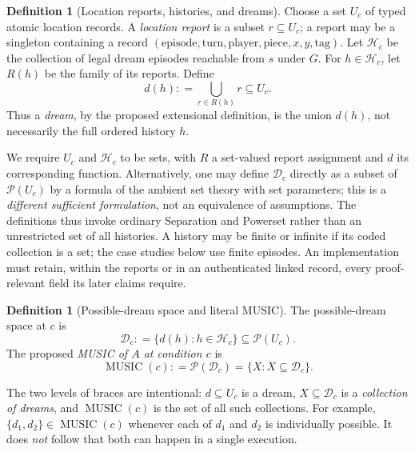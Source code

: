 \documentclass[11pt,letterpaper]{article}
\theoremstyle{definition}
\newtheorem{definition}[theorem]{Definition}
\theoremstyle{remark}
\newcommand{\PSet}{\mathcal{P}}
\newcommand{\Dream}{\mathcal{D}}
\newcommand{\Music}{\operatorname{MUSIC}}
\newcommand{\Def}{\mathrel{\mathop:}=}
\begin{document}
\begin{definition}[Location reports, histories, and dreams]
Choose a set $U_c$ of typed atomic location records. A \emph{location report} is a subset $r\subseteq U_c$; a report may be a singleton containing a record $(\mathrm{episode},\mathrm{turn},\mathrm{player},\mathrm{piece},x,y,\mathrm{tag})$. Let $\mathcal H_c$ be the collection of legal dream episodes reachable from $s$ under $G$. For $h\in\mathcal H_c$, let $R(h)$ be the family of its reports. Define
\begin{equation}\label{eq:dream}
 d(h)\Def \bigcup_{r\in R(h)}r\subseteq U_c.
\end{equation}
Thus a \emph{dream}, by the proposed extensional definition, is the union $d(h)$, not necessarily the full ordered history $h$.
\end{definition}
We require $U_c$ and $\mathcal H_c$ to be sets, with $R$ a set-valued report assignment and $d$ its corresponding function. Alternatively, one may define $\Dream_c$ directly as a subset of $\PSet(U_c)$ by a formula of the ambient set theory with set parameters; this is a \emph{different sufficient formulation}, not an equivalence of assumptions. The definitions thus invoke ordinary Separation and Powerset rather than an unrestricted set of all histories. A history may be finite or infinite if its coded collection is a set; the case studies below use finite episodes. An implementation must retain, within the reports or in an authenticated linked record, every proof-relevant field its later claims require.

\begin{definition}[Possible-dream space and literal MUSIC]\label{def:music}
The possible-dream space at $c$ is
\begin{equation}\label{eq:D}
 \Dream_c\Def \{d(h):h\in\mathcal H_c\}\subseteq\PSet(U_c).
\end{equation}
The proposed \emph{MUSIC of $A$ at condition $c$} is
\begin{equation}\label{eq:music}
 \boxed{\Music(c)\Def\PSet(\Dream_c)=\{X:X\subseteq\Dream_c\}.}
\end{equation}
\end{definition}
The two levels of braces are intentional: $d\subseteq U_c$ is a dream, $X\subseteq\Dream_c$ is a \emph{collection of dreams}, and $\Music(c)$ is the set of all such collections. For example, $\{d_1,d_2\}\in\Music(c)$ whenever each of $d_1$ and $d_2$ is individually possible. It does \emph{not} follow that both can happen in a single execution.
\end{document}
